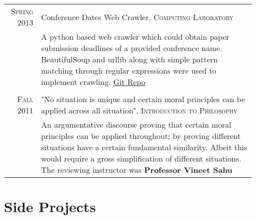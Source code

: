 \documentclass[a4paper,10pt]{article} %
\begin{document}
\begin{tabular}{r|p{11cm}}
    \textsc{Spring 2013} & Conference Dates Web Crawler, \textsc{Computing Laboratory} \\
                         & \footnotesize{A python based web crawler which could obtain paper submission
                            deadlines of a provided conference name.  BeautifulSoup and urllib along
                            with simple pattern matching through regular expressions were used to implement crawling.
                            \href{https://github.com/srijanshetty/crawler} {Git Repo} } \\
                            \\

    \textsc{Fall 2011} & "No situation is unique and certain moral principles can be applied across all situation",
                         \textsc{Introduction to Philosophy} \\
                       & \footnotesize{ An argumentative discourse proving that certain moral principles
                         can be applied throughout; by proving different situations have a certain
                         fundamental similarity.  Albeit this would require a gross simplification of
                         different situations.  The reviewing instructor was \textbf{Professor Vineet Sahu}} \\

\end{tabular}

\section{Side Projects}
\end{document}
